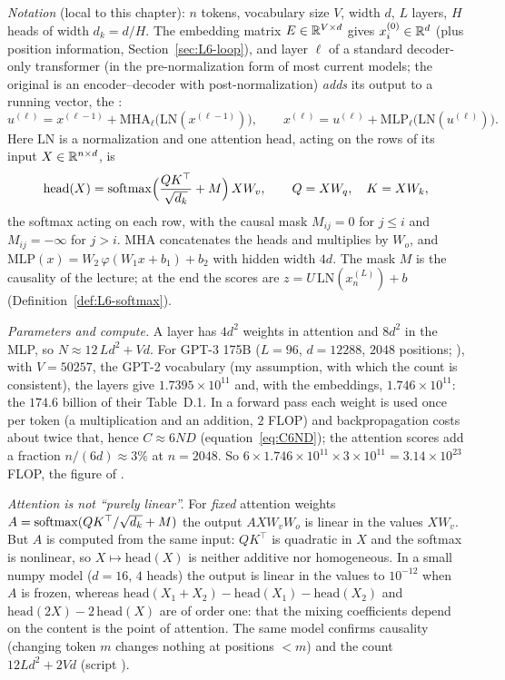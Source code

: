 \begin{beyond}\label{box:L6-block}
\emph{Notation} (local to this chapter): $n$ tokens, vocabulary size $V$, width $d$, $L$ layers, $H$ heads of width $d_k=d/H$. The embedding matrix $E\in\mathbb{R}^{V\times d}$ gives $x_i^{(0)}\in\mathbb{R}^d$ (plus position information, Section~\ref{sec:L6-loop}), and layer $\ell$ of a standard decoder-only transformer (in the pre-normalization form of most current models; the original \citep{vaswani2017} is an encoder--decoder with post-normalization) \emph{adds} its output to a running vector, the :
\[
  u^{(\ell)}=x^{(\ell-1)}+\mathrm{MHA}_\ell\big(\mathrm{LN}(x^{(\ell-1)})\big),\qquad
  x^{(\ell)}=u^{(\ell)}+\mathrm{MLP}_\ell\big(\mathrm{LN}(u^{(\ell)})\big).
\]
Here $\mathrm{LN}$ is a normalization and one attention head, acting on the rows of its input $X\in\mathbb{R}^{n\times d}$, is
\[
  \mathrm{head}(X)=\operatorname{softmax}\!\Big(\frac{QK^{\top}}{\sqrt{d_k}}+M\Big)\,XW_{v},\qquad Q=XW_q,\quad K=XW_k,
\]
the softmax acting on each row, with the causal mask $M_{ij}=0$ for $j\le i$ and $M_{ij}=-\infty$ for $j>i$. $\mathrm{MHA}$ concatenates the heads and multiplies by $W_o$, and $\mathrm{MLP}(x)=W_2\,\varphi(W_1x+b_1)+b_2$ with hidden width $4d$. The mask $M$ is the causality of the lecture; at the end the scores are $z=U\,\mathrm{LN}(x^{(L)}_n)+b$ (Definition~\ref{def:L6-softmax}).

\emph{Parameters and compute.} A layer has $4d^2$ weights in attention and $8d^2$ in the MLP, so $N\approx12\,Ld^2+Vd$. For GPT-3 175B ($L=96$, $d=12288$, $2048$ positions; \citealp{brown2020}), with $V=50257$, the GPT-2 vocabulary (my assumption, with which the count is consistent), the layers give $1.7395\times10^{11}$ and, with the embeddings, $1.746\times10^{11}$: the $174.6$ billion of their Table~D.1. In a forward pass each weight is used once per token (a multiplication and an addition, $2$ FLOP) and backpropagation costs about twice that, hence $C\approx6ND$ (equation~\eqref{eq:C6ND}); the attention scores add a fraction $n/(6d)\approx3\%$ at $n=2048$. So $6\times1.746\times10^{11}\times3\times10^{11}=3.14\times10^{23}$ FLOP, the figure of \citet{brown2020}.

\emph{Attention is not ``purely linear''.} For \emph{fixed} attention weights $A=\operatorname{softmax}(QK^{\top}/\sqrt{d_k}+M)$ the output $AXW_vW_o$ is linear in the values $XW_v$. But $A$ is computed from the same input: $QK^{\top}$ is quadratic in $X$ and the softmax is nonlinear, so $X\mapsto\mathrm{head}(X)$ is neither additive nor homogeneous. In a small numpy model ($d=16$, $4$ heads) the output is linear in the values to $10^{-12}$ when $A$ is frozen, whereas $\mathrm{head}(X_1{+}X_2)-\mathrm{head}(X_1)-\mathrm{head}(X_2)$ and $\mathrm{head}(2X)-2\,\mathrm{head}(X)$ are of order one: that the mixing coefficients depend on the content is the point of attention. The same model confirms causality (changing token $m$ changes nothing at positions $<m$) and the count $12Ld^2+2Vd$ (script ).
\end{beyond}

